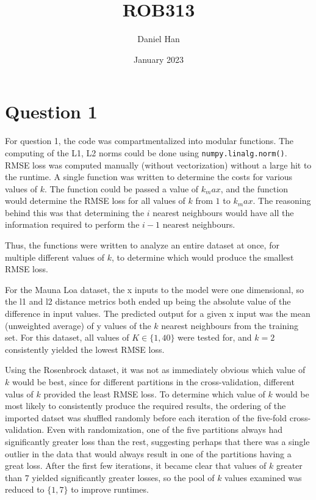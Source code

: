 \documentclass{article}
\title{ROB313}
\author{Daniel Han}
\date{January 2023}
\begin{document}
\maketitle

\section{Question 1}
For question 1, the code was compartmentalized into modular functions. The computing of the L1, L2 norms could be done using \texttt{numpy.linalg.norm()}. RMSE loss was computed manually (without vectorization) without a large hit to the runtime. A single function was written to determine the costs for various values of $k$. The function could be passed a value of $k_max$, and the function would determine the RMSE loss for all values of $k$ from $1$ to $k_max$. The reasoning behind this was that determining the $i$ nearest neighbours would have all the information required to perform the $i-1$ nearest neighbours.

Thus, the functions were written to analyze an entire dataset at once, for multiple different values of $k$, to determine which would produce the smallest RMSE loss.

For the Mauna Loa dataset, the x inputs to the model were one dimensional, so the l1 and l2 distance metrics both ended up being the absolute value of the difference in input values. The predicted output for a given x input was the mean (unweighted average) of y values of the $k$ nearest neighbours from the training set. For this dataset, all values of $K \in \{1, 40\}$ were tested for, and $k=2$ consistently yielded the lowest RMSE loss.

Using the Rosenbrock dataset, it was not as immediately obvious which value of $k$ would be best, since for different partitions in the cross-validation, different valus of $k$ provided the least RMSE loss. To determine which value of $k$ would be most likely to consistently produce the required results, the ordering of the imported datset was shuffled randomly before each iteration of the five-fold cross-validation. Even with randomization, one of the five partitions always had significantly greater loss than the rest, suggesting perhaps that there was a single outlier in the data that would always result in one of the partitions having a great loss. After the first few iterations, it became clear that values of $k$ greater than 7 yielded significantly greater losses, so the pool of $k$ values examined was reduced to $\{1,7\}$ to improve runtimes. 
\end{document}
